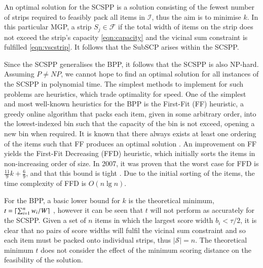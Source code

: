 \documentclass{elsarticle}
\begin{document}
\noindent An optimal solution for the SCSPP is a solution consisting of the fewest number of strips required to feasibly pack all items in $\mathcal{I}$, thus the aim is to minimise $k$. In this particular MGP, a strip $S_j \in \mathcal{F}$ if the total width of items on the strip does not exceed the strip's capacity \eqref{eqn:capacity} and the vicinal sum constraint is fulfilled \eqref{eqn:vscstrip}. It follows that the SubSCP arises within the SCSPP.

Since the SCSPP generalises the BPP, it follows that the SCSPP is also NP-hard. Assuming $P \neq NP$, we cannot hope to find an optimal solution for all instances of the SCSPP in polynomial time. The simplest methods to implement for such problems are heuristics, which trade optimality for speed. One of the simplest and most well-known heuristics for the BPP is the First-Fit (FF) heuristic, a greedy online algorithm that packs each item, given in some arbitrary order, into the lowest-indexed bin such that the capacity of the bin is not exceed, opening a new bin when required. It is known that there always exists at least one ordering of the items such that FF produces an optimal solution \cite{lewis2009}. An improvement on FF yields the First-Fit Decreasing (FFD) heuristic, which initially sorts the items in non-increasing order of size. In 2007, it was proven that the worst case for FFD is $\frac{11}{9}k + \frac{6}{9}$, and that this bound is tight \cite{dosa2007}. Due to the initial sorting of the items, the time complexity of FFD is $O(n \lg n)$. 

For the BPP, a basic lower bound for $k$ is the theoretical minimum, $t = \lceil\sum_{i=1}^{n} w_i / W\rceil$ \cite{martello1990l}, however it can be seen that $t$ will not perform as accurately for the SCSPP. Given a set of $n$ items in which the largest score width $b_i < \tau / 2$, it is clear that no pairs of score widths will fulfil the vicinal sum constraint and so each item must be packed onto individual strips, thus $|\mathcal{S}| = n$. The theoretical minimum $t$ does not consider the effect of the minimum scoring distance on the feasibility of the solution.
\end{document}
